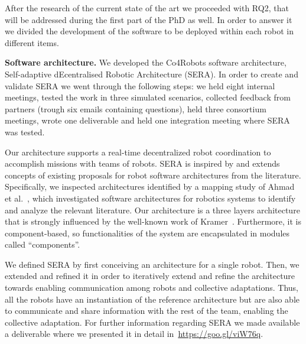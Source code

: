 After the research of the current state of the art we proceeded with RQ2, that will be addressed during the first part of the PhD as well.
In order to answer it %
we divided the development of the software to be deployed within each robot in different items.

\textbf{Software architecture.}
We developed the Co4Robots software architecture, Self-adaptive dEcentralised Robotic Architecture (SERA).
In order to create and validate SERA we went through the following steps: %
we held eight internal meetings, tested the work in three simulated scenarios, collected feedback from partners (trough six emails containing questions), held three consortium meetings, wrote one deliverable and held one integration meeting where SERA was tested.

Our architecture supports a real-time decentralized robot coordination to accomplish missions with teams of robots. 
SERA is inspired by and extends concepts of existing proposals for robot software architectures from the literature. 
Specifically, we inspected architectures identified by a mapping study of Ahmad et al.~\cite{Ahmad201616}, which investigated software architectures for robotics systems to identify and analyze the relevant literature. %
Our architecture is a three layers architecture that is strongly influenced by the well-known work of Kramer~\cite{kramer}.
Furthermore, it is component-based, %
so functionalities of the system are encapsulated in modules called ``components''.


We defined SERA by first conceiving an architecture for a single robot. 
Then, we extended and refined it in order to iteratively extend and refine the architecture towards enabling communication among robots and collective adaptations. 
Thus, all the robots have an instantiation of the reference architecture but are also able to communicate and share information with the rest of the team, enabling the collective adaptation. 
For further information regarding SERA we made available a deliverable where we presented it in detail in~\url{https://goo.gl/viW76q}.

